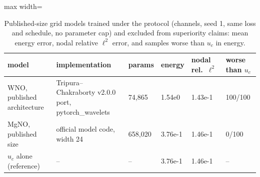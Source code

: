 \begin{table}[tbp]\centering\footnotesize\setlength{\tabcolsep}{4pt}
\caption{Published-size grid models trained under the protocol (channels, seed 1, same loss and schedule, no parameter cap) and excluded from superiority claims: mean energy error, nodal relative $\ell^2$ error, and samples worse than $u_c$ in energy.}\label{tab:excluded}
\begin{adjustbox}{max width=\linewidth}
\begin{tabular}{llllll}\toprule
model & implementation & params & energy & nodal rel.\ $\ell^2$ & worse than $u_c$ \\\midrule
WNO{,} published architecture & Tripura--Chakraborty v2.0.0 port{,} pytorch\_wavelets & 74{,}865 & 1.54e0 & 1.43e-1 & 100/100 \\
MgNO{,} published size & official model code{,} width 24 & 658{,}020 & 3.76e-1 & 1.46e-1 & 0/100 \\
$u_c$ alone (reference) & -- & -- & 3.76e-1 & 1.46e-1 & -- \\
\bottomrule\end{tabular}
\end{adjustbox}
\end{table}
